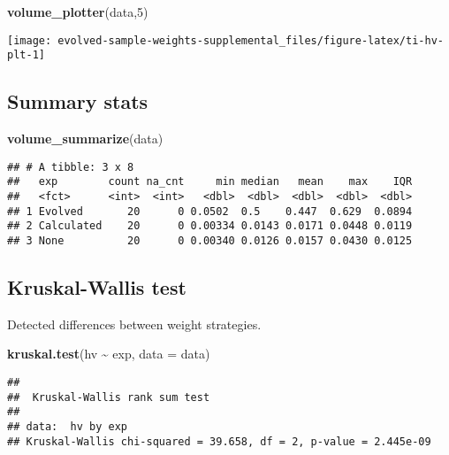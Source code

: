 \documentclass[
]{book}
\newenvironment{Shaded}{\begin{snugshade}}{\end{snugshade}}
\newcommand{\AttributeTok}[1]{\textcolor[rgb]{0.13,0.29,0.53}{#1}}
\newcommand{\DecValTok}[1]{\textcolor[rgb]{0.00,0.00,0.81}{#1}}
\newcommand{\FunctionTok}[1]{\textcolor[rgb]{0.13,0.29,0.53}{\textbf{#1}}}
\newcommand{\NormalTok}[1]{#1}
\newcommand{\SpecialCharTok}[1]{\textcolor[rgb]{0.81,0.36,0.00}{\textbf{#1}}}
\begin{document}
\begin{Shaded}
\begin{Highlighting}[]
\FunctionTok{volume\_plotter}\NormalTok{(data,}\DecValTok{5}\NormalTok{)}
\end{Highlighting}
\end{Shaded}

\texttt{[image: evolved-sample-weights-supplemental\_files/figure-latex/ti-hv-plt-1]}

\hypertarget{summary-stats-4}{%
\subsection{Summary stats}\label{summary-stats-4}}

\begin{Shaded}
\begin{Highlighting}[]
\FunctionTok{volume\_summarize}\NormalTok{(data)}
\end{Highlighting}
\end{Shaded}

\begin{verbatim}
## # A tibble: 3 x 8
##   exp        count na_cnt     min median   mean    max    IQR
##   <fct>      <int>  <int>   <dbl>  <dbl>  <dbl>  <dbl>  <dbl>
## 1 Evolved       20      0 0.0502  0.5    0.447  0.629  0.0894
## 2 Calculated    20      0 0.00334 0.0143 0.0171 0.0448 0.0119
## 3 None          20      0 0.00340 0.0126 0.0157 0.0430 0.0125
\end{verbatim}

\hypertarget{kruskal-wallis-test-4}{%
\subsection{Kruskal-Wallis test}\label{kruskal-wallis-test-4}}

Detected differences between weight strategies.

\begin{Shaded}
\begin{Highlighting}[]
\FunctionTok{kruskal.test}\NormalTok{(hv }\SpecialCharTok{\textasciitilde{}}\NormalTok{ exp, }\AttributeTok{data =}\NormalTok{ data)}
\end{Highlighting}
\end{Shaded}

\begin{verbatim}
## 
##  Kruskal-Wallis rank sum test
## 
## data:  hv by exp
## Kruskal-Wallis chi-squared = 39.658, df = 2, p-value = 2.445e-09
\end{verbatim}
\end{document}
